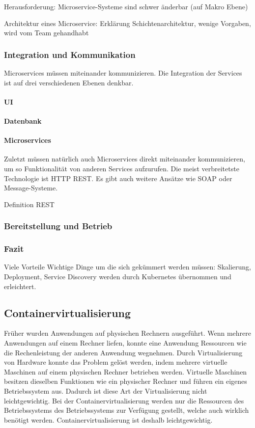 Herausforderung: Microservice-Systeme sind schwer änderbar (auf Makro Ebene)

Architektur eines Microservice: Erklärung Schichtenarchitektur, wenige Vorgaben, wird vom Team gehandhabt

\subsubsection{Integration und Kommunikation}

Microservices müssen miteinander kommunizieren. Die Integration der Services ist auf drei verschiedenen Ebenen denkbar.

\paragraph{UI}

\paragraph{Datenbank}

\paragraph{Microservices}

Zuletzt müssen natürlich auch Microservices direkt miteinander kommunizieren, um so Funktionalität von anderen Services aufzurufen. Die meist verbreitetste Technologie ist HTTP REST. Es gibt auch weitere Ansätze wie SOAP oder Message-Systeme.

{Definition REST}


\subsubsection{Bereitstellung und Betrieb}

\subsubsection{Fazit}

Viele Vorteile
Wichtige Dinge um die sich gekümmert werden müssen: Skalierung, Deployment, Service Discovery werden durch Kubernetes übernommen und erleichtert.


\subsection{Containervirtualisierung}

Früher wurden Anwendungen auf physischen Rechnern ausgeführt. Wenn mehrere Anwendungen auf einem Rechner liefen, konnte eine Anwendung Ressourcen wie die Rechenleistung der anderen Anwendung wegnehmen. Durch Virtualisierung von Hardware konnte das Problem gelöst werden, indem mehrere virtuelle Maschinen auf einem physischen Rechner betrieben werden. Virtuelle Maschinen besitzen dieselben Funktionen wie ein physischer Rechner und führen ein eigenes Betriebssystem aus. Dadurch ist diese Art der Virtualisierung nicht leichtgewichtig. Bei der Containervirtualisierung werden nur die Ressourcen des Betriebssystems des Betriebssystems zur Verfügung gestellt, welche auch wirklich benötigt werden. Containervirtualisierung ist deshalb leichtgewichtig.

